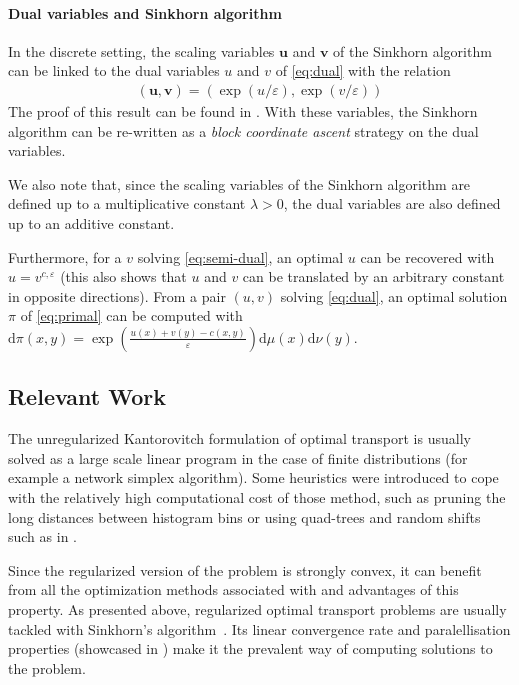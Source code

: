 \paragraph{Dual variables and Sinkhorn algorithm}
In the discrete setting, the scaling variables $\mathbf{u}$ and $\mathbf{v}$ of the Sinkhorn algorithm can be linked to the dual variables $u$ and $v$ of \eqref{eq:dual} with the relation 
\begin{align*}
    (\mathbf{u}, \mathbf{v}) = (\exp(u/\varepsilon), \exp(v/\varepsilon))
\end{align*}
The proof of this result can be found in \cite{peyre_computational_2018}. With these variables, the Sinkhorn algorithm can be re-written as a \emph{block coordinate ascent} strategy on the dual variables. 

We also note that, since the scaling variables of the Sinkhorn algorithm are defined up to a multiplicative constant $\lambda > 0$, the dual variables are also defined up to an additive constant. 

Furthermore, for a $v$ solving \eqref{eq:semi-dual}, an optimal $u$ can be recovered with $u = v^{c, \varepsilon}$ (this also shows that $u$ and $v$ can be translated by an arbitrary constant in opposite directions).
From a pair $(u,v)$ solving \eqref{eq:dual}, an optimal solution $\pi$ of \eqref{eq:primal} can be computed with $\text{d}\pi(x,y) = \exp\left(\frac{u(x) + v(y) - c(x, y)}{\varepsilon}\right)\text{d}\mu(x)\text{d}\nu(y)$.

\subsection{Relevant Work}
The unregularized Kantorovitch formulation \cite{kantorovitch_on_1942} of optimal transport is usually solved as a large scale linear program in the case of finite distributions (for example a network simplex algorithm). Some heuristics were introduced to cope with the relatively high computational cost of those method, such as pruning the long distances between histogram bins \cite{pele_fast_2009} or using quad-trees and random shifts such as in \cite{sharathkumar_near_linear_2012}.

Since the regularized version of the problem is strongly convex, it can benefit from all the optimization methods associated with and advantages of this property. As presented above, regularized optimal transport problems are usually tackled with Sinkhorn's algorithm \cite{cuturi_sinkhorn_2013}. Its linear convergence rate and paralellisation properties (showcased in \cite{solomon_convolutional_2015}) make it the prevalent way of computing solutions to the problem. 

